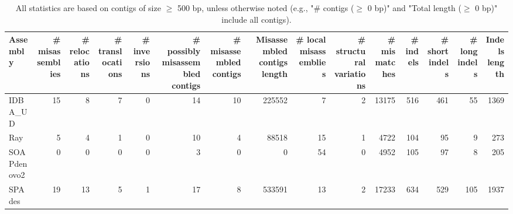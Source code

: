 \documentclass[12pt,a4paper]{article}
\begin{document}
\begin{table}[ht]
\begin{center}
\caption{All statistics are based on contigs of size $\geq$ 500 bp, unless otherwise noted (e.g., "\# contigs ($\geq$ 0 bp)" and "Total length ($\geq$ 0 bp)" include all contigs).}
\begin{tabular}{|l*{14}{|r}|}
\hline
Assembly & \# misassemblies &     \# relocations &     \# translocations &     \# inversions & \# possibly misassembled contigs & \# misassembled contigs & Misassembled contigs length & \# local misassemblies & \# structural variations & \# mismatches & \# indels &     \# short indels &     \# long indels & Indels length \\ \hline
IDBA\_UD & 15 & 8 & 7 & 0 & 14 & 10 & 225552 & 7 & 2 & 13175 & 516 & 461 & 55 & 1369 \\ \hline
Ray & 5 & 4 & 1 & 0 & 10 & 4 & 88518 & 15 & 1 & 4722 & 104 & 95 & 9 & 273 \\ \hline
SOAPdenovo2 & 0 & 0 & 0 & 0 & 3 & 0 & 0 & 54 & 0 & 4952 & 105 & 97 & 8 & 205 \\ \hline
SPAdes & 19 & 13 & 5 & 1 & 17 & 8 & 533591 & 13 & 2 & 17233 & 634 & 529 & 105 & 1937 \\ \hline
\end{tabular}
\end{center}
\end{table}
\end{document}
